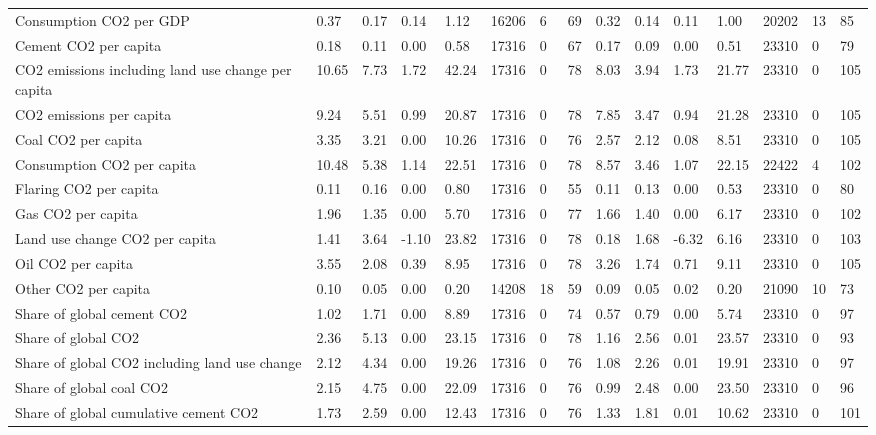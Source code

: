 \begin{longtable}{lllllllllllllll}
\addlinespace
Consumption CO2 per GDP & 0.37 & 0.17 & 0.14 & 1.12 & 16206 & 6 & 69 & 0.32 & 0.14 & 0.11 & 1.00 & 20202 & 13 & 85\\
Cement CO2 per capita & 0.18 & 0.11 & 0.00 & 0.58 & 17316 & 0 & 67 & 0.17 & 0.09 & 0.00 & 0.51 & 23310 & 0 & 79\\
CO2 emissions including land use change per capita & 10.65 & 7.73 & 1.72 & 42.24 & 17316 & 0 & 78 & 8.03 & 3.94 & 1.73 & 21.77 & 23310 & 0 & 105\\
CO2 emissions per capita & 9.24 & 5.51 & 0.99 & 20.87 & 17316 & 0 & 78 & 7.85 & 3.47 & 0.94 & 21.28 & 23310 & 0 & 105\\
Coal CO2 per capita & 3.35 & 3.21 & 0.00 & 10.26 & 17316 & 0 & 76 & 2.57 & 2.12 & 0.08 & 8.51 & 23310 & 0 & 105\\
\addlinespace
Consumption CO2 per capita & 10.48 & 5.38 & 1.14 & 22.51 & 17316 & 0 & 78 & 8.57 & 3.46 & 1.07 & 22.15 & 22422 & 4 & 102\\
Flaring CO2 per capita & 0.11 & 0.16 & 0.00 & 0.80 & 17316 & 0 & 55 & 0.11 & 0.13 & 0.00 & 0.53 & 23310 & 0 & 80\\
Gas CO2 per capita & 1.96 & 1.35 & 0.00 & 5.70 & 17316 & 0 & 77 & 1.66 & 1.40 & 0.00 & 6.17 & 23310 & 0 & 102\\
Land use change CO2 per capita & 1.41 & 3.64 & -1.10 & 23.82 & 17316 & 0 & 78 & 0.18 & 1.68 & -6.32 & 6.16 & 23310 & 0 & 103\\
Oil CO2 per capita & 3.55 & 2.08 & 0.39 & 8.95 & 17316 & 0 & 78 & 3.26 & 1.74 & 0.71 & 9.11 & 23310 & 0 & 105\\
\addlinespace
Other CO2 per capita & 0.10 & 0.05 & 0.00 & 0.20 & 14208 & 18 & 59 & 0.09 & 0.05 & 0.02 & 0.20 & 21090 & 10 & 73\\
Share of global cement CO2 & 1.02 & 1.71 & 0.00 & 8.89 & 17316 & 0 & 74 & 0.57 & 0.79 & 0.00 & 5.74 & 23310 & 0 & 97\\
Share of global CO2 & 2.36 & 5.13 & 0.00 & 23.15 & 17316 & 0 & 78 & 1.16 & 2.56 & 0.01 & 23.57 & 23310 & 0 & 93\\
Share of global CO2 including land use change & 2.12 & 4.34 & 0.00 & 19.26 & 17316 & 0 & 76 & 1.08 & 2.26 & 0.01 & 19.91 & 23310 & 0 & 97\\
Share of global coal CO2 & 2.15 & 4.75 & 0.00 & 22.09 & 17316 & 0 & 76 & 0.99 & 2.48 & 0.00 & 23.50 & 23310 & 0 & 96\\
\addlinespace
Share of global cumulative cement CO2 & 1.73 & 2.59 & 0.00 & 12.43 & 17316 & 0 & 76 & 1.33 & 1.81 & 0.01 & 10.62 & 23310 & 0 & 101\\

\end{longtable}
